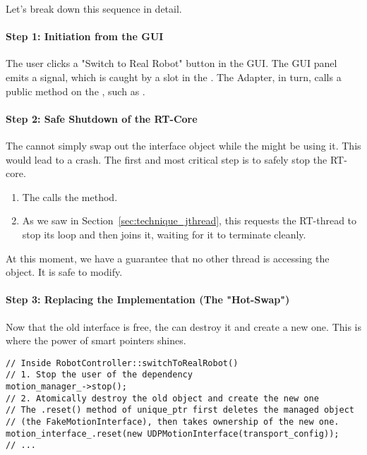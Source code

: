 Let's break down this sequence in detail.

\paragraph{Step 1: Initiation from the GUI}
The user clicks a "Switch to Real Robot" button in the GUI. The GUI panel emits a signal, which is caught by a slot in the . The Adapter, in turn, calls a public method on the , such as .

\paragraph{Step 2: Safe Shutdown of the RT-Core}
The  cannot simply swap out the interface object while the  might be using it. This would lead to a crash. The first and most critical step is to safely stop the RT-core.
\begin{enumerate}
    \item The  calls the  method.
    \item As we saw in Section~\ref{sec:technique_jthread}, this requests the RT-thread to stop its loop and then joins it, waiting for it to terminate cleanly.
\end{enumerate}
At this moment, we have a guarantee that no other thread is accessing the  object. It is safe to modify.

\paragraph{Step 3: Replacing the Implementation (The "Hot-Swap")}
Now that the old interface is free, the  can destroy it and create a new one. This is where the power of smart pointers shines.

\begin{verbatim}
// Inside RobotController::switchToRealRobot()
// 1. Stop the user of the dependency
motion_manager_->stop();
// 2. Atomically destroy the old object and create the new one
// The .reset() method of unique_ptr first deletes the managed object
// (the FakeMotionInterface), then takes ownership of the new one.
motion_interface_.reset(new UDPMotionInterface(transport_config));
// ...
\end{verbatim}
\label{lst:swap-implementation}

